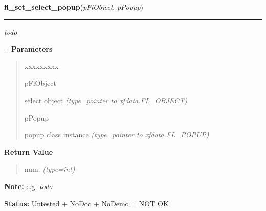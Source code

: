 \hspace{.8\funcindent}\begin{boxedminipage}{\funcwidth}

    \raggedright \textbf{fl\_set\_select\_popup}(\textit{pFlObject}, \textit{pPopup})

    \vspace{-1.5ex}

    \rule{\textwidth}{0.5\fboxrule}
\setlength{\parskip}{2ex}

\emph{todo}

-{}-
\setlength{\parskip}{1ex}
      \textbf{Parameters}
      \vspace{-1ex}

      \begin{quote}
        \begin{Ventry}{xxxxxxxxx}

          \item[pFlObject]


select object
            {\it (type=pointer to xfdata.FL\_OBJECT)}

          \item[pPopup]


popup class instance
            {\it (type=pointer to xfdata.FL\_POPUP)}

        \end{Ventry}

      \end{quote}

      \textbf{Return Value}
    \vspace{-1ex}

      \begin{quote}

num.
      {\it (type=int)}

      \end{quote}

\textbf{Note:} 
e.g. \emph{todo}


\textbf{Status:} 
Untested + NoDoc + NoDemo = NOT OK


    \end{boxedminipage}

    \label{xformslib:flselect:fl_get_select_item}

    \vspace{0.5ex}

